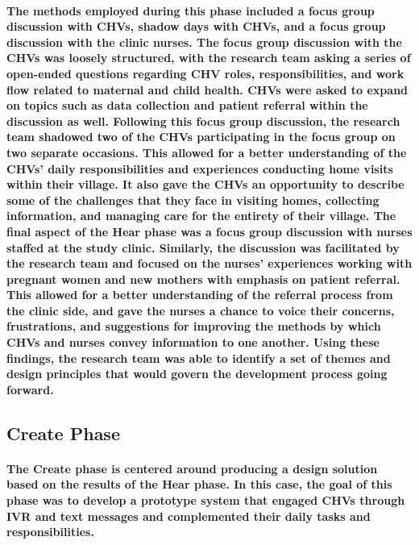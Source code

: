 \paragraph{The methods employed during this phase included a focus group discussion with CHVs, shadow days with CHVs, and a focus group discussion with the clinic nurses. The focus group discussion with the CHVs was loosely structured, with the research team asking a series of open-ended questions regarding CHV roles, responsibilities, and work flow related to maternal and child health. CHVs were asked to expand on topics such as data collection and patient referral within the discussion as well. Following this focus group discussion, the research team shadowed two of the CHVs participating in the focus group on two separate occasions. This allowed for a better understanding of the CHVs' daily responsibilities and experiences conducting home visits within their village. It also gave the CHVs an opportunity to describe some of the challenges that they face in visiting homes, collecting information, and managing care for the entirety of their village. The final aspect of the Hear phase was a focus group discussion with nurses staffed at the study clinic. Similarly, the discussion was facilitated by the research team and focused on the nurses' experiences working with pregnant women and new mothers with emphasis on patient referral. This allowed for a better understanding of the referral process from the clinic side, and gave the nurses a chance to voice their concerns, frustrations, and suggestions for improving the methods by which CHVs and nurses convey information to one another. Using these findings, the research team was able to identify a set of themes and design principles that would govern the development process going forward.}

\subsection{Create Phase}
\paragraph{The Create phase is centered around producing a design solution based on the results of the Hear phase. In this case, the goal of this phase was to develop a prototype system that engaged CHVs through IVR and text messages and complemented their daily tasks and responsibilities. }

